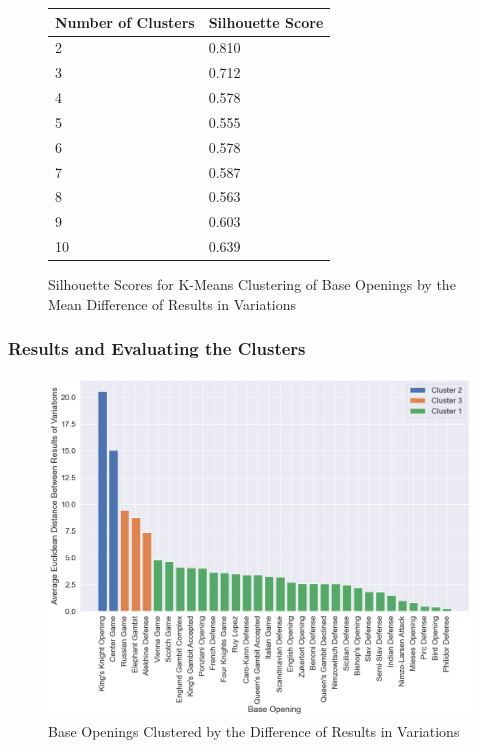\documentclass[a4paper, 11pt]{article}
\begin{document}
\begin{figure}[H]
    \centering
    \caption{Silhouette Scores for K-Means Clustering of Base Openings by the Mean Difference of Results in Variations}
    \label{fig:silhouetteScoresForBaseOpeningsClusteredByDifferenceInVariations}
    \begin{tabular}{| l | l |} 
        \hline
        \bf{Number of Clusters} & \bf{Silhouette Score} \\ [0.5ex] 
        \hline
        2 & 0.810 \\
        \hline
        3 & 0.712 \\
        \hline
        4 & 0.578 \\
        \hline
        5 & 0.555 \\
        \hline
        6 & 0.578 \\
        \hline
        7 & 0.587 \\
        \hline
        8 & 0.563 \\
        \hline
        9 & 0.603 \\
        \hline
        10 & 0.639 \\
        \hline
    \end{tabular}
\end{figure}

\subsubsection{Results and Evaluating the Clusters}

\begin{figure}[H]
    \centering
    \caption{Base Openings Clustered by the Difference of Results in Variations}
    \label{fig:baseOpeningsClusteredByDifferenceOfResultsInVariations}
    \includegraphics[width=\textwidth]{Base Openings Clustered by Difference in Variations.png}
\end{figure}
\end{document}
